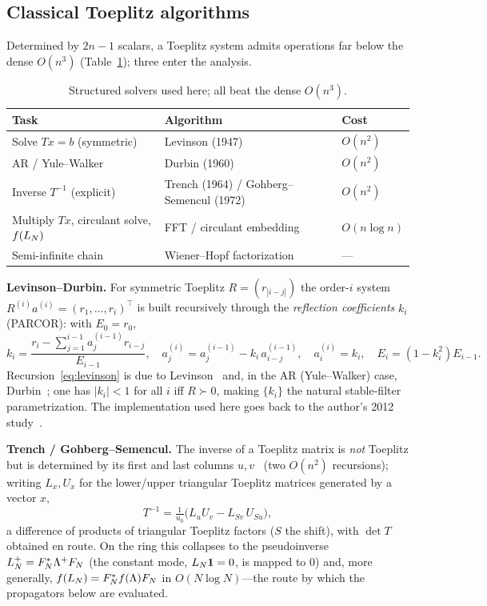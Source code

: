 \subsection{Classical Toeplitz algorithms}
Determined by $2n-1$ scalars, a Toeplitz system admits operations far below the dense $O(n^3)$
(Table~\ref{tab:toeplitz}); three enter the analysis.

\begin{table}[ht]\centering
\begin{tabular}{lll}
\toprule
Task & Algorithm & Cost \\
\midrule
Solve $Tx=b$ (symmetric) & Levinson (1947) & $O(n^2)$ \\
AR / Yule--Walker & Durbin (1960) & $O(n^2)$ \\
Inverse $T^{-1}$ (explicit) & Trench (1964) / Gohberg--Semencul (1972) & $O(n^2)$ \\
Multiply $Tx$, circulant solve, $f(L_N)$ & FFT / circulant embedding & $O(n\log n)$ \\
Semi-infinite chain & Wiener--Hopf factorization & --- \\
\bottomrule
\end{tabular}
\caption{Structured solvers used here; all beat the dense $O(n^3)$.}\label{tab:toeplitz}
\end{table}

\noindent\textbf{Levinson--Durbin.} For symmetric Toeplitz $R=(r_{|i-j|})$ the order-$i$ system
$R^{(i)}a^{(i)}=(r_1,\dots,r_i)^\top$ is built recursively through the \emph{reflection coefficients}
$k_i$ (PARCOR): with $E_0=r_0$,
\begin{equation}\label{eq:levinson}
  k_i=\frac{r_i-\sum_{j=1}^{i-1}a^{(i-1)}_j r_{i-j}}{E_{i-1}},\quad
  a^{(i)}_j=a^{(i-1)}_j-k_i\,a^{(i-1)}_{i-j},\quad a^{(i)}_i=k_i,\quad E_i=(1-k_i^2)E_{i-1}.
\end{equation}
Recursion~\eqref{eq:levinson} is due to Levinson~\cite{Levinson} and, in the AR (Yule--Walker) case,
Durbin~\cite{Durbin}; one has $|k_i|<1$ for all $i$ iff $R\succ0$, making $\{k_i\}$ the natural
stable-filter parametrization. The implementation used here goes back to the author's 2012
study~\cite{Gradina12}.

\noindent\textbf{Trench / Gohberg--Semencul.} The inverse of a Toeplitz matrix is \emph{not} Toeplitz
but is determined by its first and last columns $u,v$~\cite{Trench,GS} (two $O(n^2)$ recursions); writing $L_x,U_x$
for the lower/upper triangular Toeplitz matrices generated by a vector $x$,
\begin{equation}\label{eq:gs}
  T^{-1}=\tfrac1{u_0}\bigl(L_u U_{v}-L_{Sv}\,U_{Su}\bigr),
\end{equation}
a difference of products of triangular Toeplitz factors ($S$ the shift), with $\det T$ obtained en
route. On the ring this collapses to the pseudoinverse $L_N^{+}=F_N^\ast\Lambda^{+}F_N$ (the constant
mode, $L_N\mathbf1=0$, is mapped to $0$) and, more generally, $f(L_N)=F_N^\ast f(\Lambda)F_N$ in
$O(N\log N)$---the route by which the propagators below are evaluated.


